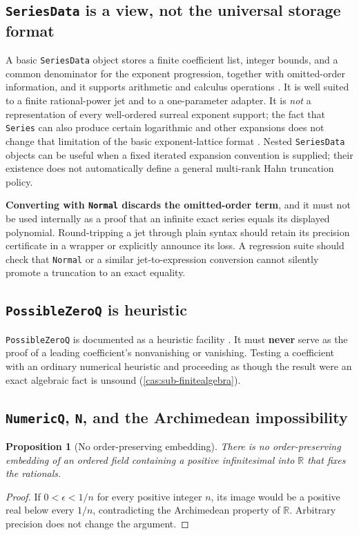 \documentclass[11pt,letterpaper]{article}
\numberwithin{equation}{section}
\newtheorem{proposition}[theorem]{Proposition}
\theoremstyle{definition}
\theoremstyle{remark}
\newcommand{\R}{\mathbb R}
\begin{document}
\subsection{\texttt{SeriesData} is a view, not the universal storage format}
\label{cas:sub-seriesdata}
A basic \texttt{SeriesData} object stores a finite coefficient list, integer
bounds, and a common denominator for the exponent progression, together with
omitted-order information, and it supports arithmetic and calculus operations
\cite{cas:WLSeriesData}. It is well suited to a finite rational-power jet and to
a one-parameter adapter. It is \emph{not} a representation of every well-ordered
surreal exponent support; the fact that \texttt{Series} can also produce certain
logarithmic and other expansions does not change that limitation of the basic
exponent-lattice format \cite{cas:WLSeries}. Nested \texttt{SeriesData} objects
can be useful when a fixed iterated expansion convention is supplied; their
existence does not automatically define a general multi-rank Hahn truncation
policy.

\textbf{Converting with \texttt{Normal} discards the omitted-order term}, and it
must not be used internally as a proof that an infinite exact series equals its
displayed polynomial. Round-tripping a jet through plain syntax should retain
its precision certificate in a wrapper or explicitly announce its loss. A
regression suite should check that \texttt{Normal} or a similar jet-to-expression
conversion cannot silently promote a truncation to an exact equality.

\subsection{\texttt{PossibleZeroQ} is heuristic}
\label{cas:sub-possiblezeroq}
\texttt{PossibleZeroQ} is documented as a heuristic facility
\cite{cas:WLPossibleZeroQ}. It must \textbf{never} serve as the proof of a
leading coefficient's nonvanishing or vanishing. Testing a coefficient with an
ordinary numerical heuristic and proceeding as though the result were an exact
algebraic fact is unsound (\cref{cas:sub-finitealgebra}).

\subsection{\texttt{NumericQ}, \texttt{N}, and the Archimedean impossibility}
\label{cas:sub-numericq}
\begin{proposition}[No order-preserving embedding]\label{cas:prop-archimedean}
There is no order-preserving embedding of an ordered field containing a positive
infinitesimal into $\R$ that fixes the rationals.
\end{proposition}
\begin{proof}
If $0<\epsilon<1/n$ for every positive integer $n$, its image would be a
positive real below every $1/n$, contradicting the Archimedean property of $\R$.
Arbitrary precision does not change the argument.
\end{proof}
\end{document}
